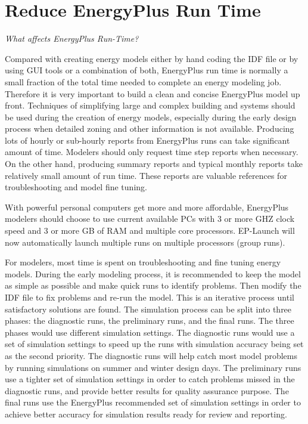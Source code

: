 \section{Reduce EnergyPlus Run Time}\label{reduce-energyplus-run-time}

\emph{What affects EnergyPlus Run-Time?}

Compared with creating energy models either by hand coding the IDF file or by using GUI tools or a combination of both, EnergyPlus run time is normally a small fraction of the total time needed to complete an energy modeling job. Therefore it is very important to build a clean and concise EnergyPlus model up front. Techniques of simplifying large and complex building and systems should be used during the creation of energy models, especially during the early design process when detailed zoning and other information is not available. Producing lots of hourly or sub-hourly reports from EnergyPlus runs can take significant amount of time. Modelers should only request time step reports when necessary. On the other hand, producing summary reports and typical monthly reports take relatively small amount of run time. These reports are valuable references for troubleshooting and model fine tuning.

With powerful personal computers get more and more affordable, EnergyPlus modelers should choose to use current available PCs with 3 or more GHZ clock speed and 3 or more GB of RAM and multiple core processors. EP-Launch will now automatically launch multiple runs on multiple processors (group runs).

For modelers, most time is spent on troubleshooting and fine tuning energy models. During the early modeling process, it is recommended to keep the model as simple as possible and make quick runs to identify problems. Then modify the IDF file to fix problems and re-run the model. This is an iterative process until satisfactory solutions are found. The simulation process can be split into three phases: the diagnostic runs, the preliminary runs, and the final runs. The three phases would use different simulation settings. The diagnostic runs would use a set of simulation settings to speed up the runs with simulation accuracy being set as the second priority. The diagnostic runs will help catch most model problems by running simulations on summer and winter design days. The preliminary runs use a tighter set of simulation settings in order to catch problems missed in the diagnostic runs, and provide better results for quality assurance purpose. The final runs use the EnergyPlus recommended set of simulation settings in order to achieve better accuracy for simulation results ready for review and reporting.

